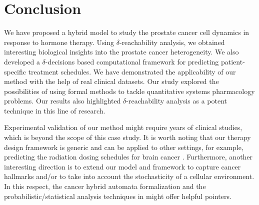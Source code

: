 \section{Conclusion}
\label{sec:Conclusion}

We have proposed a hybrid model to study the prostate cancer cell dynamics in response to hormone therapy. Using $\delta$-reachability analysis, we obtained interesting biological insights into the prostate cancer heterogeneity. We also developed a $\delta$-decisions based computational framework for predicting patient-specific treatment schedules. We have demonstrated the applicability of our method with the help of real clinical datasets. Our study explored the possibilities of using formal methods to tackle quantitative systems pharmacology problems. Our results also highlighted $\delta$-reachability analysis as a potent technique in this line of research. 

Experimental validation of our method might require years of clinical studies, which is beyond the scope of this case study. It is worth noting that our therapy design framework is generic and can be applied to other settings, for example, predicting the radiation dosing schedules for brain cancer \cite{leder14}. Furthermore, another interesting direction is to extend our model and framework to capture cancer hallmarks and/or to take into account the stochasticity of a cellular environment. In this respect, the cancer hybrid automata formalization \cite{bud14} and the probabilistic/statistical analysis techniques in \cite{liu11,liu13,liu12bioinfo} might offer helpful pointers.
